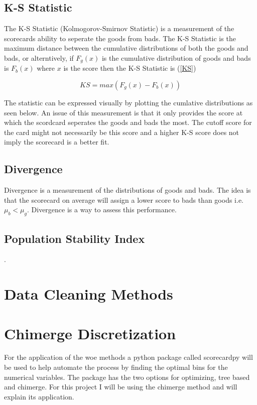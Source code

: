 \subsection*{K-S Statistic}

The K-S Statistic (Kolmogorov-Smirnov Statistic) is a measurement of the scorecards ability to seperate the goods from bads. The K-S Statistic is the maximum distance between the cumulative distributions of both the goods and bads, or alterntively, if $F_{g}(x)$ is the cumulative distribution of goods and bads is $F_{b}(x)$ where $x$ is the score then the K-S Statistic is (\ref{KS})

\begin{equation}\label{KS}
KS = max(F_{g}(x) - F_{b}(x))
\end{equation}

The statistic can be expressed visually by plotting the cumlative distributions as seen below. An issue of this measurement is that it only provides the score at which the scordcard seperates the goods and bads the most. The cutoff score for the card might not necessarily be this score and a higher K-S score does not imply the scorecard is a better fit. 

\subsection*{Divergence}

Divergence is a measurement of the distributions of goods and bads. The idea is that the scorecard on average will assign a lower score to bads than goods i.e. $\mu_{b} < \mu_{g}$. Divergence is a way to assess this performance. 

\subsection*{Population Stability Index}

.

\section{Data Cleaning Methods}

\section{Chimerge Discretization} \label{chimerge}

For the application of the woe methods a python package called scorecardpy will be used to help automate the process by finding the optimal bins for the numerical variables. The package has the two options for optimizing, tree based and chimerge. For this project I will be using the chimerge method and will explain its application. \\

